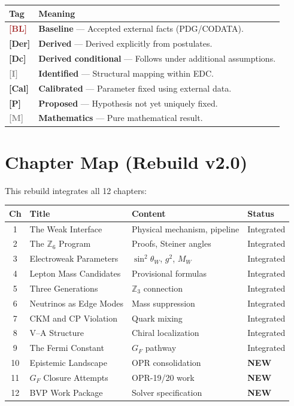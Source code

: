 \documentclass[11pt,a4paper]{book}
\theoremstyle{definition}
\theoremstyle{remark}
\newcommand{\tagBL}{\textcolor{brown}{\textbf{[BL]}}}
\newcommand{\tagDer}{\textcolor{derivedColor}{\textbf{[Der]}}}
\newcommand{\tagDc}{\textcolor{calibratedColor}{\textbf{[Dc]}}}
\newcommand{\tagI}{\textcolor{gray}{\textbf{[I]}}}
\newcommand{\tagCal}{\textcolor{postulatedColor}{\textbf{[Cal]}}}
\newcommand{\tagP}{\textcolor{postulatedColor}{\textbf{[P]}}}
\newcommand{\tagM}{\textcolor{gray}{\textbf{[M]}}}
\begin{document}
\begin{center}
\begin{tabular}{@{}lp{10cm}@{}}
\toprule
\textbf{Tag} & \textbf{Meaning} \\
\midrule
\tagBL{}  & \textbf{Baseline} --- Accepted external facts (PDG/CODATA). \\
\tagDer{} & \textbf{Derived} --- Derived explicitly from postulates. \\
\tagDc{}  & \textbf{Derived conditional} --- Follows under additional assumptions. \\
\tagI{}   & \textbf{Identified} --- Structural mapping within EDC. \\
\tagCal{} & \textbf{Calibrated} --- Parameter fixed using external data. \\
\tagP{}   & \textbf{Proposed} --- Hypothesis not yet uniquely fixed. \\
\tagM{}   & \textbf{Mathematics} --- Pure mathematical result. \\
\bottomrule
\end{tabular}
\end{center}

\section*{Chapter Map (Rebuild v2.0)}

This rebuild integrates all 12 chapters:

\begin{center}
\begin{tabular}{clll}
\toprule
\textbf{Ch} & \textbf{Title} & \textbf{Content} & \textbf{Status} \\
\midrule
1 & The Weak Interface & Physical mechanism, pipeline & Integrated \\
2 & The $\mathbb{Z}_6$ Program & Proofs, Steiner angles & Integrated \\
3 & Electroweak Parameters & $\sin^2\theta_W$, $g^2$, $M_W$ & Integrated \\
4 & Lepton Mass Candidates & Provisional formulas & Integrated \\
5 & Three Generations & $\mathbb{Z}_3$ connection & Integrated \\
6 & Neutrinos as Edge Modes & Mass suppression & Integrated \\
7 & CKM and CP Violation & Quark mixing & Integrated \\
8 & V--A Structure & Chiral localization & Integrated \\
9 & The Fermi Constant & $G_F$ pathway & Integrated \\
10 & Epistemic Landscape & OPR consolidation & \textbf{NEW} \\
11 & $G_F$ Closure Attempts & OPR-19/20 work & \textbf{NEW} \\
12 & BVP Work Package & Solver specification & \textbf{NEW} \\
\bottomrule
\end{tabular}
\end{center}
\end{document}
